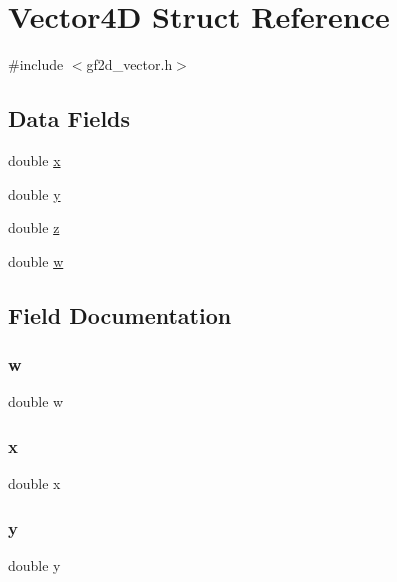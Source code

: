 \hypertarget{struct_vector4_d}{}\section{Vector4D Struct Reference}
\label{struct_vector4_d}


{\ttfamily \#include $<$gf2d\+\_\+vector.\+h$>$}

\subsection*{Data Fields}
\begin{DoxyCompactItemize}
\item 
double \hyperlink{struct_vector4_d_af88b946fb90d5f08b5fb740c70e98c10}{x}
\item 
double \hyperlink{struct_vector4_d_ab927965981178aa1fba979a37168db2a}{y}
\item 
double \hyperlink{struct_vector4_d_ab3e6ed577a7c669c19de1f9c1b46c872}{z}
\item 
double \hyperlink{struct_vector4_d_afb3248bab1c7ee0ad97e9d4c275b4c67}{w}
\end{DoxyCompactItemize}


\subsection{Field Documentation}
\mbox{\label{struct_vector4_d_afb3248bab1c7ee0ad97e9d4c275b4c67}} 
\subsubsection{\texorpdfstring{w}{w}}
{\footnotesize\ttfamily double w}

\mbox{\label{struct_vector4_d_af88b946fb90d5f08b5fb740c70e98c10}} 
\subsubsection{\texorpdfstring{x}{x}}
{\footnotesize\ttfamily double x}

\mbox{\label{struct_vector4_d_ab927965981178aa1fba979a37168db2a}} 
\subsubsection{\texorpdfstring{y}{y}}
{\footnotesize\ttfamily double y}

